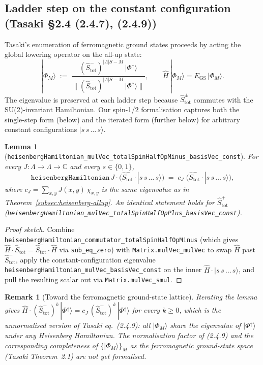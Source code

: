 \documentclass[a4paper,11pt]{article}
\newtheorem{lemma}[theorem]{Lemma}
\newtheorem{remark}[theorem]{Remark}
\begin{document}
\subsection{Ladder step on the constant configuration (Tasaki §2.4 (2.4.7), (2.4.9))}
\label{subsec:heisenberg-ladder}

Tasaki's enumeration of ferromagnetic ground states proceeds by acting
the global lowering operator on the all-up state:
\[
  |\Phi_{M}\rangle
  \;:=\; \frac{(\hat S_{\mathrm{tot}}^{-})^{|\Lambda|S - M}\,
                  |\Phi^{\uparrow}\rangle}
                {\bigl\|(\hat S_{\mathrm{tot}}^{-})^{|\Lambda|S - M}\,
                          |\Phi^{\uparrow}\rangle\bigr\|},
  \qquad
  \hat H\,|\Phi_{M}\rangle = E_{\mathrm{GS}}\,|\Phi_{M}\rangle.
\]
The eigenvalue is preserved at each ladder step because $\hat
S_{\mathrm{tot}}^{\pm}$ commutes with the SU(2)-invariant
Hamiltonian.  Our spin-1/2 formalisation captures both the single-step
form (below) and the iterated form (further below) for arbitrary
constant configurations $|s\,s\,\dots\,s\rangle$.

\begin{lemma}[\texttt{heisenbergHamiltonian\_mulVec\_totalSpinHalfOpMinus\_basisVec\_const}]
For every $J : \Lambda \to \Lambda \to \mathbb{C}$ and every
$s \in \{0,1\}$,
\[
  \texttt{heisenbergHamiltonian}\,J \cdot
    \bigl(\hat S_{\mathrm{tot}}^{-} \cdot |s\,s\,\dots\,s\rangle\bigr)
  \;=\;
  c_{J}\;
    \bigl(\hat S_{\mathrm{tot}}^{-} \cdot |s\,s\,\dots\,s\rangle\bigr),
\]
where $c_{J} = \sum_{x,y}J(x,y)\,\chi_{x,y}$ is the same eigenvalue as
in Theorem~\ref{subsec:heisenberg-allup}.  An identical statement holds
for $\hat S_{\mathrm{tot}}^{+}$
(\texttt{heisenbergHamiltonian\_mulVec\_totalSpinHalfOpPlus\_basisVec\_const}).
\end{lemma}

\begin{proof}[Proof sketch]
Combine
\texttt{heisenbergHamiltonian\_commutator\_totalSpinHalfOpMinus} (which
gives $\hat H \cdot \hat S_{\mathrm{tot}}^{-} = \hat S_{\mathrm{tot}}^{-}
\cdot \hat H$ via \texttt{sub\_eq\_zero}) with
\texttt{Matrix.mulVec\_mulVec} to swap $\hat H$ past
$\hat S_{\mathrm{tot}}^{-}$, apply the constant-configuration eigenvalue
\texttt{heisenbergHamiltonian\_mulVec\_basisVec\_const} on the inner
$\hat H \cdot |s\,s\,\dots\,s\rangle$, and pull the resulting scalar
out via \texttt{Matrix.mulVec\_smul}.
\end{proof}

\begin{remark}[Toward the ferromagnetic ground-state lattice]
Iterating the lemma gives
$\hat H \cdot (\hat S_{\mathrm{tot}}^{-})^{k}\,|\Phi^{\uparrow}\rangle
   = c_{J}\,(\hat S_{\mathrm{tot}}^{-})^{k}\,|\Phi^{\uparrow}\rangle$
for every $k \geq 0$, which is the unnormalised version of Tasaki
eq.~(2.4.9): all $|\Phi_{M}\rangle$ share the eigenvalue of
$|\Phi^{\uparrow}\rangle$ under any Heisenberg Hamiltonian.  The
normalisation factor of (2.4.9) and the corresponding
\emph{completeness} of $\{|\Phi_{M}\rangle\}_{M}$ as the ferromagnetic
ground-state space (Tasaki Theorem~2.1) are not yet formalised.
\end{remark}
\end{document}
